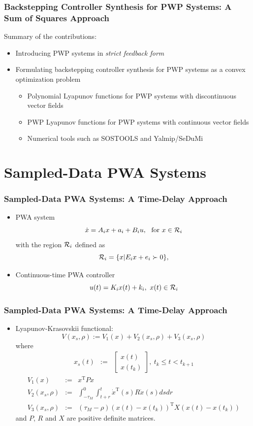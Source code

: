 \documentclass{beamer}
\newcommand{\TR}{\text{T}}
\newcommand{\RR}{{\cal R}}
\newcommand{\beq}{\begin{equation*}}
\newcommand{\eeq}{\end{equation*}}
\newcommand{\bmat}{\left[\begin{array}}
\newcommand{\emat}{\end{array}\right]}
\begin{document}
\frame
  {
    \frametitle{Backstepping Controller Synthesis for PWP Systems: A Sum of Squares Approach}
    Summary of the contributions:
    \begin{itemize}
    \item Introducing PWP systems in \emph{strict feedback form}
    \item Formulating backstepping controller synthesis for PWP systems as a convex optimization problem
    \begin{itemize}
    \item Polynomial Lyapunov functions for PWP systems with discontinuous vector fields
    \item PWP Lyapunov functions for PWP systems with continuous vector fields
    \item Numerical tools such as SOSTOOLS and Yalmip/SeDuMi
    \end{itemize}
		\end{itemize}
}  

\section[]{Sampled-Data PWA Systems}
  \frame
  {
    \frametitle{Sampled-Data PWA Systems: A Time-Delay Approach}
\begin{itemize}
\item<1-> PWA system
\beq
\dot x=A_ix+a_i+B_iu,\ \text{ for }x\in\RR_i
\eeq
with the region $\RR_i$ defined as
\beq
\RR_i=\{x| E_ix+e_i\succ 0\},
\eeq
\item<2-> Continuous-time PWA controller
\beq
u(t)=K_ix(t)+k_i,\ x(t)\in\RR_i
\eeq
\end{itemize}
}  

  \frame
  {
    \frametitle{Sampled-Data PWA Systems: A Time-Delay Approach}
    \begin{itemize}
    \item Lyapunov-Krasovskii functional:
\beq
V(x_s,\rho) := V_1(x)+V_2(x_s,\rho)+V_3(x_s,\rho)
\eeq
where 
\begin{eqnarray}
x_s(t) &:=& \bmat{c}x(t)\\x(t_k)\emat,\ t_k\leq t<t_{k+1}\nonumber
\end{eqnarray}
\begin{eqnarray}
V_1(x)&:=&x^\TR Px\nonumber\\
V_2(x_s,\rho)&:=&\int_{-\tau_M}^0\int_{t+r}^t\dot x^\TR(s)R\dot x(s)dsdr\nonumber\\
V_3(x_s,\rho)&:=&(\tau_M-\rho)(x(t)-x(t_k))^\TR X(x(t)-x(t_k))\nonumber
\end{eqnarray}
and $P$, $R$ and $X$ are positive definite matrices.
\end{itemize}
  }
\end{document}
